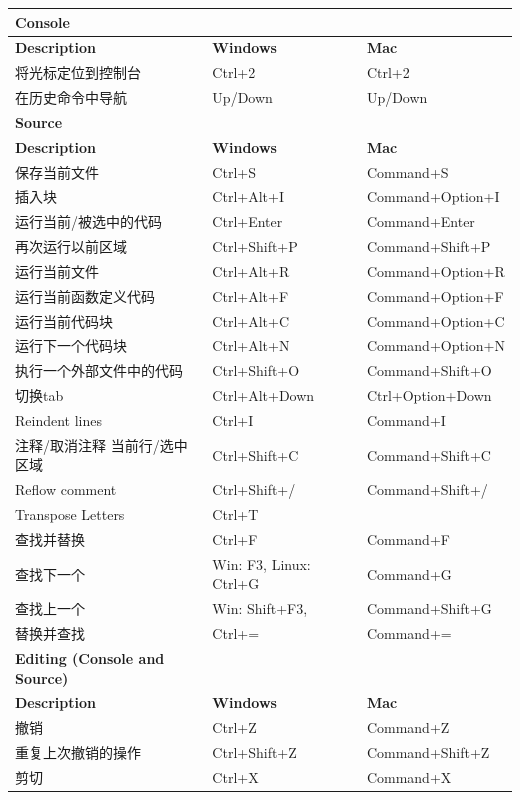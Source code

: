 \documentclass[]{ctexbook}
\theoremstyle{definition}
\theoremstyle{definition}
\theoremstyle{definition}
\theoremstyle{definition}
\theoremstyle{remark}
\begin{document}
\begin{longtable}[]{@{}lll@{}}
\toprule\noalign{}
Console & & \\
\midrule\noalign{}
\endhead
\bottomrule\noalign{}
\endlastfoot
\textbf{Description} & \textbf{Windows} & \textbf{Mac} \\
将光标定位到控制台 & Ctrl+2 & Ctrl+2 \\
在历史命令中导航 & Up/Down & Up/Down \\
\textbf{Source} & & \\
\textbf{Description} & \textbf{Windows} & \textbf{Mac} \\
保存当前文件 & Ctrl+S & Command+S \\
插入块 & Ctrl+Alt+I & Command+Option+I \\
运行当前/被选中的代码 & Ctrl+Enter & Command+Enter \\
再次运行以前区域 & Ctrl+Shift+P & Command+Shift+P \\
运行当前文件 & Ctrl+Alt+R & Command+Option+R \\
运行当前函数定义代码 & Ctrl+Alt+F & Command+Option+F \\
运行当前代码块 & Ctrl+Alt+C & Command+Option+C \\
运行下一个代码块 & Ctrl+Alt+N & Command+Option+N \\
执行一个外部文件中的代码 & Ctrl+Shift+O & Command+Shift+O \\
切换tab & Ctrl+Alt+Down & Ctrl+Option+Down \\
Reindent lines & Ctrl+I & Command+I \\
注释/取消注释 当前行/选中区域 & Ctrl+Shift+C & Command+Shift+C \\
Reflow comment & Ctrl+Shift+/ & Command+Shift+/ \\
Transpose Letters & Ctrl+T & \\
查找并替换 & Ctrl+F & Command+F \\
查找下一个 & Win: F3, Linux: Ctrl+G & Command+G \\
查找上一个 & Win: Shift+F3, & Command+Shift+G \\
替换并查找 & Ctrl+= & Command+= \\
\textbf{Editing (Console and Source)} & & \\
\textbf{Description} & \textbf{Windows} & \textbf{Mac} \\
撤销 & Ctrl+Z & Command+Z \\
重复上次撤销的操作 & Ctrl+Shift+Z & Command+Shift+Z \\
剪切 & Ctrl+X & Command+X \\

\end{longtable}
\end{document}
